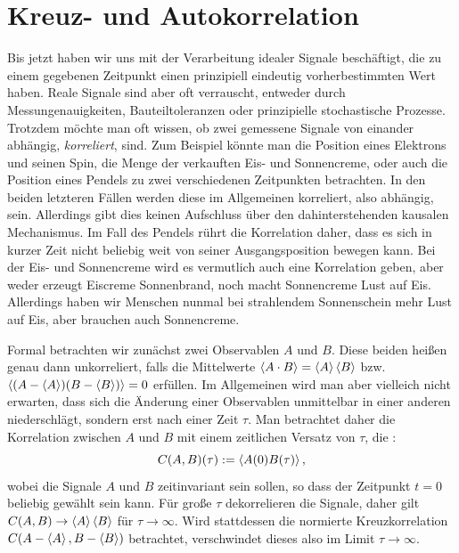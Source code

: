 \section{Kreuz- und Autokorrelation}

Bis jetzt haben wir uns mit der Verarbeitung idealer Signale
beschäftigt, die zu einem gegebenen Zeitpunkt einen prinzipiell
eindeutig vorherbestimmten Wert haben.  Reale Signale sind aber oft
verrauscht, entweder durch Messungenauigkeiten, Bauteiltoleranzen oder
prinzipielle stochastische Prozesse.  Trotzdem möchte man oft wissen,
ob zwei gemessene Signale von einander abhängig, \emph{korreliert},
sind. Zum Beispiel könnte man die Position eines Elektrons und seinen
Spin, die Menge der verkauften Eis- und Sonnencreme, oder auch die
Position eines Pendels zu zwei verschiedenen Zeitpunkten betrachten.
In den beiden letzteren Fällen werden diese im Allgemeinen korreliert,
also abhängig, sein. Allerdings gibt dies keinen Aufschluss über den
dahinterstehenden kausalen Mechanismus. Im Fall des Pendels rührt die
Korrelation daher, dass es sich in kurzer Zeit nicht beliebig weit von
seiner Ausgangsposition bewegen kann. Bei der Eis- und Sonnencreme
wird es vermutlich auch eine Korrelation geben, aber weder erzeugt
Eiscreme Sonnenbrand, noch macht Sonnencreme Lust auf Eis. Allerdings
haben wir Menschen nunmal bei strahlendem Sonnenschein mehr Lust auf
Eis, aber brauchen auch Sonnencreme.

Formal betrachten wir zunächst zwei Observablen $A$ und $B$. Diese
beiden heißen genau dann unkorreliert, falls die Mittelwerte
$\left\langle{A\cdot B}\right\rangle = \left\langle{A}\right\rangle\left\langle{B}\right\rangle$
bzw. $\left\langle{(A-\left\langle{A}\right\rangle)(B-\left\langle{B}\right\rangle)}\right\rangle=0$ erfüllen.  Im Allgemeinen
wird man aber vielleich nicht erwarten, dass sich die Änderung einer
Observablen unmittelbar in einer anderen niederschlägt, sondern erst
nach einer Zeit $\tau$.  Man betrachtet daher die Korrelation zwischen
$A$ und $B$ mit einem zeitlichen Versatz von $\tau$, die
\emph{}:
\begin{equation}
  \label{eq:crosscorr}
  C(A,B)(\tau) := \left\langle{A(0)B(\tau)}\right\rangle,
\end{equation}
wobei die Signale $A$ und $B$ zeitinvariant sein sollen, so dass der
Zeitpunkt $t=0$ beliebig gewählt sein kann. Für große $\tau$
dekorrelieren die Signale, daher gilt $C(A,B)\to \left\langle{A}\right\rangle\left\langle{B}\right\rangle$ für
$\tau\to\infty$. Wird stattdessen die normierte Kreuzkorrelation
$C(A-\left\langle{A}\right\rangle, B-\left\langle{B}\right\rangle)$ betrachtet, verschwindet dieses also im
Limit $\tau\to\infty$.

